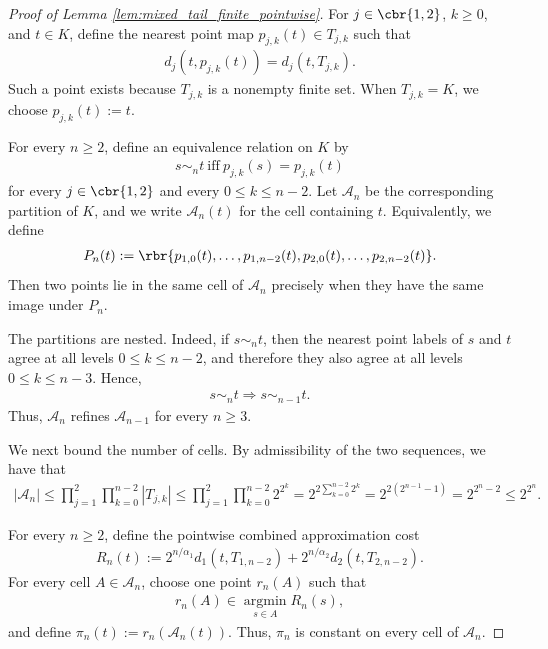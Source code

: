 \documentclass[11pt]{article}
\begin{document}
\begin{proof}[Proof of Lemma
\ref{lem:mixed_tail_finite_pointwise}]
For $j\in\cbr{1,2}$, $k\ge0$, and $t\in K$, define the nearest point map $p_{j,k}(t)\in T_{j,k}$ such that
\begin{align*}
d_j(t,p_{j,k}(t))
=
d_j(t,T_{j,k}).
\end{align*}
Such a point exists because $T_{j,k}$ is a nonempty finite set. When
$T_{j,k}=K$, we choose $p_{j,k}(t):=t$.

For every $n\ge2$, define an equivalence relation on $K$ by
\begin{align*}
s\sim_n t\ \text{iff}\ p_{j,k}(s)=p_{j,k}(t)
\end{align*}
for every $j\in\cbr{1,2}$ and every $0\le k\le n-2$. Let
$\mathcal A_n$ be the corresponding partition of $K$, and we write
$\mathcal A_n(t)$ for the cell containing $t$. Equivalently, we define
\begin{align*}
P_n(t)
:=
\rbr{
p_{1,0}(t),\ldots,p_{1,n-2}(t),
p_{2,0}(t),\ldots,p_{2,n-2}(t)
}.
\end{align*}
Then two points lie in the same cell of $\mathcal A_n$ precisely when
they have the same image under $P_n$.

The partitions are nested. Indeed, if $s\sim_n t$, then the nearest
point labels of $s$ and $t$ agree at all levels $0\le k\le n-2$, and
therefore they also agree at all levels $0\le k\le n-3$. Hence,
\begin{align*}
s\sim_n t
\Rightarrow
s\sim_{n-1}t.
\end{align*}
Thus, $\mathcal A_n$ refines $\mathcal A_{n-1}$ for every $n\ge3$.

We next bound the number of cells. By admissibility of the two
sequences, we have that
\begin{align*}
|\mathcal A_n|\le
\prod_{j=1}^2
\prod_{k=0}^{n-2}
|T_{j,k}|\le
\prod_{j=1}^2
\prod_{k=0}^{n-2}
2^{2^k}=
2^{2\sum_{k=0}^{n-2}2^k}=
2^{2(2^{n-1}-1)}=
2^{2^n-2}\le
2^{2^n}.
\end{align*}

For every $n\ge2$, define the pointwise combined approximation cost
\begin{align*}
R_n(t)
:=
2^{n/\alpha_1}d_1(t,T_{1,n-2})
+
2^{n/\alpha_2}d_2(t,T_{2,n-2}).
\end{align*}
For every cell $A\in\mathcal A_n$, choose one point $r_n(A)$ such that
\begin{align*}
r_n(A)\in\operatorname*{argmin}_{s\in A}R_n(s),
\end{align*}
and define $\pi_n(t):=r_n(\mathcal A_n(t))$.
Thus, $\pi_n$ is constant on every cell of $\mathcal A_n$.


\end{proof}
\end{document}
